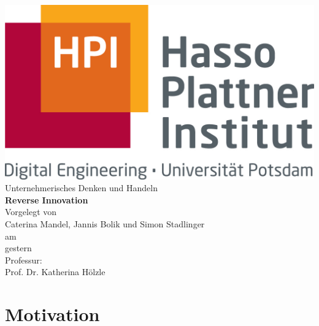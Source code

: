 \documentclass[a4paper,11pt]{scrartcl}
\author{Simon  Stadlinger}
\begin{document}
	\begin{titlepage}
		\centering
		\includegraphics[scale=.6]{hpi_logo.jpg}\\\vspace{2cm}
		{\Large Unternehmerisches Denken und Handeln}\\\vspace{2cm}
		{\Huge \textbf{Reverse Innovation}}\\\vspace{2cm}
		{\large Vorgelegt von}\\\vspace{.5cm}
		{\Large Caterina Mandel, Jannis Bolik und Simon Stadlinger  }\\\vspace{.5cm}
		{\large am}\\\vspace{.5cm}
		{\Large gestern }\\\vspace{5cm}
		{\large Professur:}\\\vspace{.5cm}
		{\Large Prof. Dr. Katherina Hölzle}
		
		
	\end{titlepage}
\newpage
\thispagestyle{empty}
\section*{}
\newpage
\pagestyle{fancy}



\tableofcontents\newpage
\section{Motivation}
\end{document}
